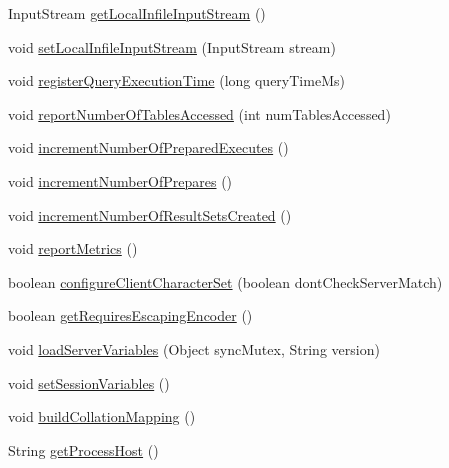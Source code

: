 \begin{DoxyCompactItemize}
\item 
Input\+Stream \mbox{\hyperlink{classcom_1_1mysql_1_1cj_1_1_native_session_a07fe80b10addfe76ac7399e85cc54916}{get\+Local\+Infile\+Input\+Stream}} ()
\item 
void \mbox{\hyperlink{classcom_1_1mysql_1_1cj_1_1_native_session_ac7ccf772bceca1b9c12a073619520b8e}{set\+Local\+Infile\+Input\+Stream}} (Input\+Stream stream)
\item 
void \mbox{\hyperlink{classcom_1_1mysql_1_1cj_1_1_native_session_a26d00142698f2c53818c936aa4c31b74}{register\+Query\+Execution\+Time}} (long query\+Time\+Ms)
\item 
void \mbox{\hyperlink{classcom_1_1mysql_1_1cj_1_1_native_session_a64d119e0ec21d5146318d90f9da8e1b5}{report\+Number\+Of\+Tables\+Accessed}} (int num\+Tables\+Accessed)
\item 
void \mbox{\hyperlink{classcom_1_1mysql_1_1cj_1_1_native_session_ac006a8d0bf0acab736f072395051c611}{increment\+Number\+Of\+Prepared\+Executes}} ()
\item 
void \mbox{\hyperlink{classcom_1_1mysql_1_1cj_1_1_native_session_a7fab2f90790ac45fb124763817343f07}{increment\+Number\+Of\+Prepares}} ()
\item 
void \mbox{\hyperlink{classcom_1_1mysql_1_1cj_1_1_native_session_a3f78cb07289164ae9c99faa73fd6ff77}{increment\+Number\+Of\+Result\+Sets\+Created}} ()
\item 
void \mbox{\hyperlink{classcom_1_1mysql_1_1cj_1_1_native_session_aed85a5a9a7dd415b1f63e010c2a54d33}{report\+Metrics}} ()
\item 
boolean \mbox{\hyperlink{classcom_1_1mysql_1_1cj_1_1_native_session_abf5696ade184fb2908093b85c3b644be}{configure\+Client\+Character\+Set}} (boolean dont\+Check\+Server\+Match)
\item 
boolean \mbox{\hyperlink{classcom_1_1mysql_1_1cj_1_1_native_session_a94f1148508cff92c1ae9a20234990b5a}{get\+Requires\+Escaping\+Encoder}} ()
\item 
void \mbox{\hyperlink{classcom_1_1mysql_1_1cj_1_1_native_session_af9eebdf7b6270a82f07d2cb4c2566ca6}{load\+Server\+Variables}} (Object sync\+Mutex, String version)
\item 
void \mbox{\hyperlink{classcom_1_1mysql_1_1cj_1_1_native_session_a09162b4113f8e3d40a981090278f02f8}{set\+Session\+Variables}} ()
\item 
void \mbox{\hyperlink{classcom_1_1mysql_1_1cj_1_1_native_session_ad05f537e9c5212829c93ac8bc1b2ee91}{build\+Collation\+Mapping}} ()
\item 
String \mbox{\hyperlink{classcom_1_1mysql_1_1cj_1_1_native_session_ad4fcecc07b825e551a6ba61534ef36d9}{get\+Process\+Host}} ()

\end{DoxyCompactItemize}

